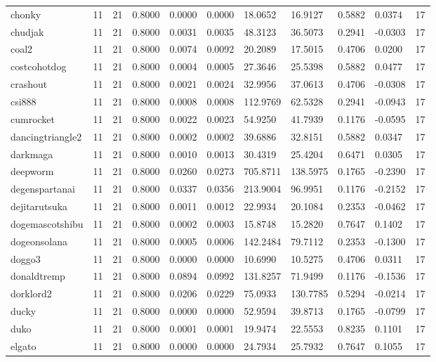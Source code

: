 \begin{table}[htbp]
\begin{tabular}{lllllllllll}
chonky & 11 & 21 & 0.8000 & 0.0000 & 0.0000 & 18.0652 & 16.9127 & 0.5882 & 0.0374 & 17 \\
chudjak & 11 & 21 & 0.8000 & 0.0031 & 0.0035 & 48.3123 & 36.5073 & 0.2941 & -0.0303 & 17 \\
coal2 & 11 & 21 & 0.8000 & 0.0074 & 0.0092 & 20.2089 & 17.5015 & 0.4706 & 0.0200 & 17 \\
costcohotdog & 11 & 21 & 0.8000 & 0.0004 & 0.0005 & 27.3646 & 25.5398 & 0.5882 & 0.0477 & 17 \\
crashout & 11 & 21 & 0.8000 & 0.0021 & 0.0024 & 32.9956 & 37.0613 & 0.4706 & -0.0308 & 17 \\
csi888 & 11 & 21 & 0.8000 & 0.0008 & 0.0008 & 112.9769 & 62.5328 & 0.2941 & -0.0943 & 17 \\
cumrocket & 11 & 21 & 0.8000 & 0.0022 & 0.0023 & 54.9250 & 41.7939 & 0.1176 & -0.0595 & 17 \\
dancingtriangle2 & 11 & 21 & 0.8000 & 0.0002 & 0.0002 & 39.6886 & 32.8151 & 0.5882 & 0.0347 & 17 \\
darkmaga & 11 & 21 & 0.8000 & 0.0010 & 0.0013 & 30.4319 & 25.4204 & 0.6471 & 0.0305 & 17 \\
deepworm & 11 & 21 & 0.8000 & 0.0260 & 0.0273 & 705.8711 & 138.5975 & 0.1765 & -0.2390 & 17 \\
degenspartanai & 11 & 21 & 0.8000 & 0.0337 & 0.0356 & 213.9004 & 96.9951 & 0.1176 & -0.2152 & 17 \\
dejitarutsuka & 11 & 21 & 0.8000 & 0.0011 & 0.0012 & 22.9934 & 20.1084 & 0.2353 & -0.0462 & 17 \\
dogemascotshibu & 11 & 21 & 0.8000 & 0.0002 & 0.0003 & 15.8748 & 15.2820 & 0.7647 & 0.1402 & 17 \\
dogeonsolana & 11 & 21 & 0.8000 & 0.0005 & 0.0006 & 142.2484 & 79.7112 & 0.2353 & -0.1300 & 17 \\
doggo3 & 11 & 21 & 0.8000 & 0.0000 & 0.0000 & 10.6990 & 10.5275 & 0.4706 & 0.0311 & 17 \\
donaldtremp & 11 & 21 & 0.8000 & 0.0894 & 0.0992 & 131.8257 & 71.9499 & 0.1176 & -0.1536 & 17 \\
dorklord2 & 11 & 21 & 0.8000 & 0.0206 & 0.0229 & 75.0933 & 130.7785 & 0.5294 & -0.0214 & 17 \\
ducky & 11 & 21 & 0.8000 & 0.0000 & 0.0000 & 52.9594 & 39.8713 & 0.1765 & -0.0799 & 17 \\
duko & 11 & 21 & 0.8000 & 0.0001 & 0.0001 & 19.9474 & 22.5553 & 0.8235 & 0.1101 & 17 \\
elgato & 11 & 21 & 0.8000 & 0.0000 & 0.0000 & 24.7934 & 25.7932 & 0.7647 & 0.1055 & 17 \\

\end{tabular}
\end{table}
